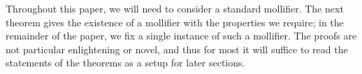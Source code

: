 \documentclass[12pt,reqno]{article}
\numberwithin{equation}{section}
\newtheorem*{remark}{Remark}
\DeclareMathOperator{\EE}{\mathbf{E}}
\newcommand{\psitwo}[1]{\| {#1} \|_{\psi_2(L)}}
\begin{document}
\begin{itemize}
\begin{comment}
    
    
        \item If $X_1, \dots, X_N$ are \emph{independent}, then
        \[ \psitwo{X_1 + \dots + X_N} \leq 10 \left( \psitwo{X_1}^2 + \dots + \psitwo{X_N}^2 \right)^{1/2}. \]
        This is an equivalent way to state \emph{Hoeffding's Inequality}, and we refer to an application of this inequality as an application of Hoeffding's inequality.
    \end{itemize}
    Roughly speaking, if $X$ is a random variable with $\psitwo{X} \leq A$, we can think of $X$ as being sharply concentrated in the region $[-A,A]$. The Orlicz norm thus provides a convenient way to quantify concentration phenomena.
    \begin{remark}
        The constants involved in these statements are suboptimal, but will suffice for our purposes. Proofs can be found in Chapter 2 of \cite{Vershynin}.
    \end{remark}

    \end{comment}
\end{itemize}

Throughout this paper, we will need to consider a standard mollifier. The next theorem gives the existence of a mollifier with the properties we require; in the remainder of the paper, we fix a single instance of such a mollifier. The proofs are not particular enlightening or novel, and thus for most it will suffice to read the statements of the theorems as a setup for later sections.
\end{document}
